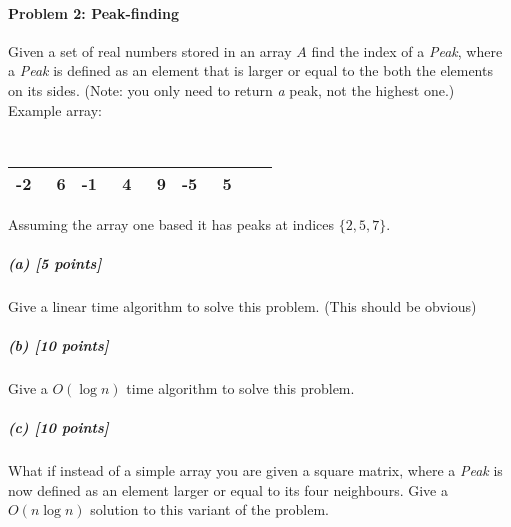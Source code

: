 \documentclass[11pt]{article}
\begin{document}
\paragraph{Problem 2: Peak-finding}
Given a set of real numbers stored in an array $A$ find the index of a {\em Peak}, where a {\em Peak} is defined as an
element that is larger or equal to the both the elements on its sides. (Note: you only need to return {\em a} peak, not
the highest one.)\\

Example array:
                {\tt
                \begin{tabular}{|*{9}{r|}}
                    \hline
                    -2 & \ 6 & -1 & \ 4 & \ 9 & -5 & \ 5  \\
                    \hline
                \end{tabular}
                }

Assuming the array one based it has peaks at indices $\{2,5,7 \}$.

\subparagraph{(a) [5 points]}
Give a linear time algorithm to solve this problem. (This should be obvious)
\subparagraph{(b) [10 points]}
Give a $O(\log n)$ time algorithm to solve this problem.



\subparagraph{(c) [10 points]}
What if instead of a simple array you are given a square matrix, where a {\em Peak} is now defined as an element larger
or equal to its four neighbours. Give a $O(n \log n)$ solution to this variant of the problem.


\end{document}
